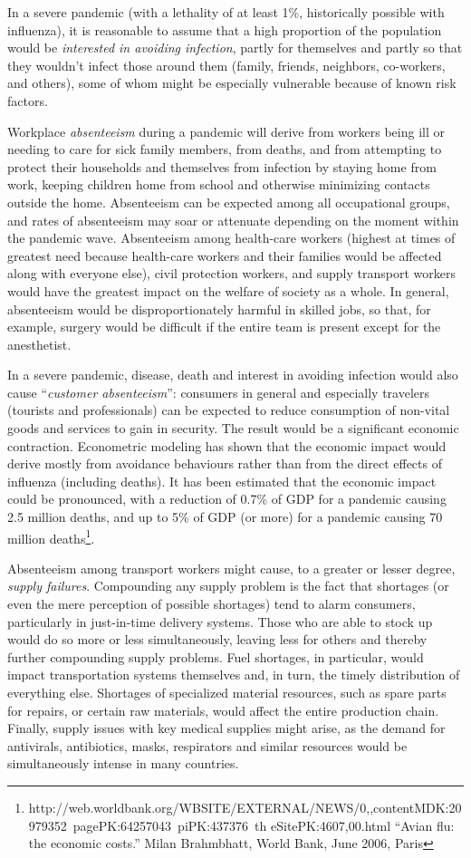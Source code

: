 \documentclass[12pt, a4]{scrartcl}
\begin{document}
In a severe pandemic (with a lethality of at least 1\%, historically possible with influenza), it is reasonable to assume that a high proportion of the population would be \emph{interested in avoiding infection}, partly for themselves and partly so that they wouldn't infect those around them (family, friends, neighbors, co-workers, and others), some of whom might be especially vulnerable because of known risk factors.

Workplace \emph{absenteeism} during a pandemic will derive from workers being ill or needing to care for sick family members, from deaths, and from attempting to protect their households and themselves from infection by staying home from work, keeping children home from school and otherwise minimizing contacts outside the home. Absenteeism can be expected among all occupational groups, and rates of absenteeism may soar or attenuate depending on the moment within the pandemic wave. Absenteeism among health-care workers (highest at times of greatest need because health-care workers and their families would be affected along with everyone else), civil protection workers, and supply transport workers would have the greatest impact on the welfare of society as a whole. In general, absenteeism would be disproportionately harmful in skilled jobs, so that, for example, surgery would be difficult if the entire team is present except for the anesthetist.

In a severe pandemic, disease, death and interest in avoiding infection would also cause “\emph{customer absenteeism}”: consumers in general and especially travelers (tourists and professionals) can be expected to reduce consumption of non-vital goods and services to gain in security. The result would be a significant economic contraction. Econometric modeling has shown that the economic impact would derive mostly from avoidance behaviours rather than from the direct effects of influenza (including deaths). It has been estimated that the economic impact could be pronounced, with a reduction of 0.7\% of GDP for a pandemic causing 2.5 million deaths, and up to 5\% of GDP (or more) for a pandemic causing 70 million deaths\footnote{http://web.worldbank.org/WBSITE/EXTERNAL/NEWS/0,,contentMDK:20979352~pagePK:64257043~piPK:437376~th eSitePK:4607,00.html “Avian flu: the economic costs.” Milan Brahmbhatt, World Bank, June 2006, Paris}.

Absenteeism among transport workers might cause, to a greater or lesser degree, \emph{supply failures}. Compounding any supply problem is the fact that shortages (or even the mere perception of possible shortages) tend to alarm consumers, particularly in just-in-time delivery systems. Those who are able to stock up would do so more or less simultaneously, leaving less for others and thereby further compounding supply problems. Fuel shortages, in particular, would impact transportation systems themselves and, in turn, the timely distribution of everything else. Shortages of specialized material resources, such as spare parts for repairs, or certain raw materials, would affect the entire production chain. Finally, supply issues with key medical supplies might arise, as the demand for antivirals, antibiotics, masks, respirators and similar resources would be simultaneously intense in many countries.
\end{document}
